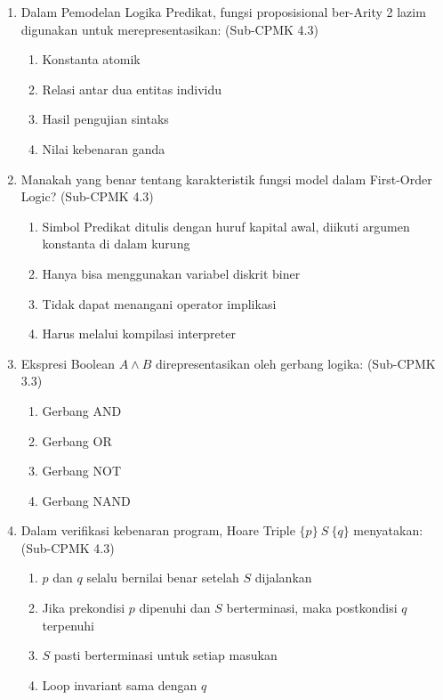 \begin{enumerate}
  \item Dalam Pemodelan Logika Predikat, fungsi proposisional ber-Arity 2 lazim digunakan untuk merepresentasikan: (Sub-CPMK 4.3)
  \begin{enumerate}
    \item Konstanta atomik
    \item Relasi antar dua entitas individu
    \item Hasil pengujian sintaks
    \item Nilai kebenaran ganda
  \end{enumerate}
  
  \item Manakah yang benar tentang karakteristik fungsi model dalam First-Order Logic? (Sub-CPMK 4.3)
  \begin{enumerate}
    \item Simbol Predikat ditulis dengan huruf kapital awal, diikuti argumen konstanta di dalam kurung
    \item Hanya bisa menggunakan variabel diskrit biner
    \item Tidak dapat menangani operator implikasi
    \item Harus melalui kompilasi interpreter
  \end{enumerate}
  
  \item Ekspresi Boolean $A \wedge B$ direpresentasikan oleh gerbang logika: (Sub-CPMK 3.3)
  \begin{enumerate}
    \item Gerbang AND
    \item Gerbang OR
    \item Gerbang NOT
    \item Gerbang NAND
  \end{enumerate}
  
  \item Dalam verifikasi kebenaran program, Hoare Triple $\{p\}\ S\ \{q\}$ menyatakan: (Sub-CPMK 4.3)
  \begin{enumerate}
    \item $p$ dan $q$ selalu bernilai benar setelah $S$ dijalankan
    \item Jika prekondisi $p$ dipenuhi dan $S$ berterminasi, maka postkondisi $q$ terpenuhi
    \item $S$ pasti berterminasi untuk setiap masukan
    \item Loop invariant sama dengan $q$
  \end{enumerate}
\end{enumerate}

